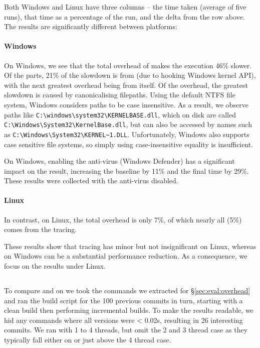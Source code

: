 Both Windows and Linux have three columns -- the time taken (average of five runs), that time as a percentage of the \Make run, and the delta from the row above. The results are significantly different between platforms:

\paragraph{Windows} On Windows, we see that the total overhead of \Rattle makes the execution 46\% slower. Of the parts, 21\% of the slowdown is from \Fsatrace (due to hooking Windows kernel API), with the next greatest overhead being from \Rattle itself. Of the \Rattle overhead, the greatest slowdown is caused by canonicalising filepaths. Using the default NTFS file system, Windows considers paths to be case insensitive. As a result, we observe paths like \verb"C:\windows\system32\KERNELBASE.dll", which on disk are called \verb"C:\Windows\System32\KernelBase.dll", but can also be accessed by names such as \verb"C:\Windows\System32\KERNEL~1.DLL". Unfortunately, Windows also supports case sensitive file systems, so simply using case-insensitive equality is insufficient.

On Windows, enabling the anti-virus (Windows Defender) has a significant impact on the result, increasing the \Make baseline by 11\% and the final time by 29\%. These results were collected with the anti-virus disabled.

\paragraph{Linux} In contrast, on Linux, the total overhead is only 7\%, of which nearly all (5\%) comes from the tracing.

\postparagraphs

These results show that tracing has minor but not insignificant on Linux, whereas on Windows can be a substantial performance reduction. As a consequence, we focus on the results under Linux.

\subsection{\Fsatrace}
\label{sec:eval:fsatrace}

To compare \Make and \Rattle on \Fsatrace we took the commands we extracted for \S\ref{sec:eval:overhead} and ran the build script for the 100 previous commits in turn, starting with a clean build then performing incremental builds. To make the results readable, we hid any commands where all versions were < 0.02s, resulting in 26 interesting commits. We ran with 1 to 4 threads, but omit the 2 and 3 thread case as they typically fall either on or just above the 4 thread case.

